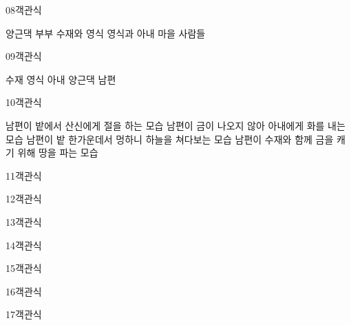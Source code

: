 \documentclass[fs9,seriesRus]{korfarm-base}
\begin{document}
\begin{kfQBlock}{08}{객관식}
\begin{kfChoices}
\kfChoice 양근댁 부부
\kfChoice 수재와 영식
\kfChoice 영식과 아내
\kfChoice 마을 사람들
\end{kfChoices}
\end{kfQBlock}
\begin{kfQBlock}{09}{객관식}
\begin{kfChoices}
\kfChoice 수재
\kfChoice 영식
\kfChoice 아내
\kfChoice 양근댁 남편
\end{kfChoices}
\end{kfQBlock}
\begin{kfQBlock}{10}{객관식}
\begin{kfChoices}
\kfChoice 남편이 밭에서 산신에게 절을 하는 모습
\kfChoice 남편이 금이 나오지 않아 아내에게 화를 내는 모습
\kfChoice 남편이 밭 한가운데서 멍하니 하늘을 쳐다보는 모습
\kfChoice 남편이 수재와 함께 금을 캐기 위해 땅을 파는 모습
\end{kfChoices}
\end{kfQBlock}
\begin{kfQBlock}{11}{객관식}
\end{kfQBlock}
\begin{kfQBlock}{12}{객관식}
\end{kfQBlock}
\begin{kfQBlock}{13}{객관식}
\end{kfQBlock}
\begin{kfQBlock}{14}{객관식}
\end{kfQBlock}
\begin{kfQBlock}{15}{객관식}
\end{kfQBlock}
\begin{kfQBlock}{16}{객관식}
\end{kfQBlock}
\begin{kfQBlock}{17}{객관식}
\end{kfQBlock}
\end{document}
